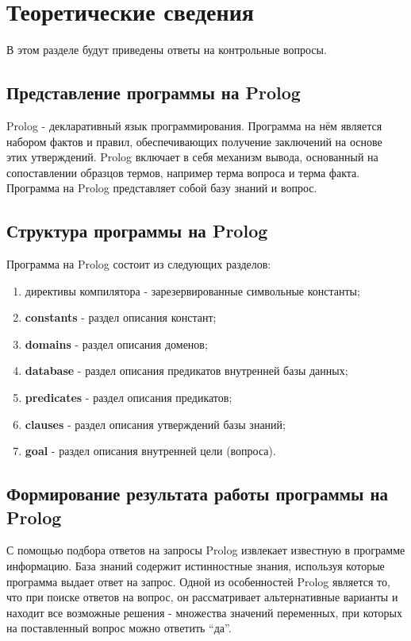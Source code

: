 \chapter{Теоретические сведения}
В этом разделе будут приведены ответы на контрольные вопросы.

\section{Представление программы на Prolog}

Prolog - декларативный язык программирования. Программа на нём является набором фактов и правил, обеспечивающих получение заключений на основе этих утверждений. Prolog включает в себя механизм вывода, основанный на сопоставлении образцов термов, например терма вопроса и терма факта. Программа на Prolog представляет собой базу знаний и вопрос.

\section{Структура программы на Prolog}

Программа на Prolog состоит из следующих разделов:
\begin{enumerate}
    \item директивы компилятора - зарезервированные символьные константы;
    \item \textbf{constants} - раздел описания констант;
    \item \textbf{domains} - раздел описания доменов;
    \item \textbf{database} - раздел описания предикатов внутренней базы данных;
    \item \textbf{predicates} - раздел описания предикатов;
    \item \textbf{clauses} - раздел описания утверждений базы знаний;
    \item \textbf{goal} - раздел описания внутренней цели (вопроса).
\end{enumerate}

\section{Формирование результата работы программы на Prolog}

С помощью подбора ответов на запросы Prolog извлекает известную в программе информацию. База знаний содержит истинностные знания, используя которые программа выдает ответ на запрос. Одной из особенностей Prolog является то, что при поиске ответов на вопрос, он рассматривает альтернативные варианты и находит все возможные решения - множества значений переменных, при которых на поставленный вопрос можно ответить ``да''.

